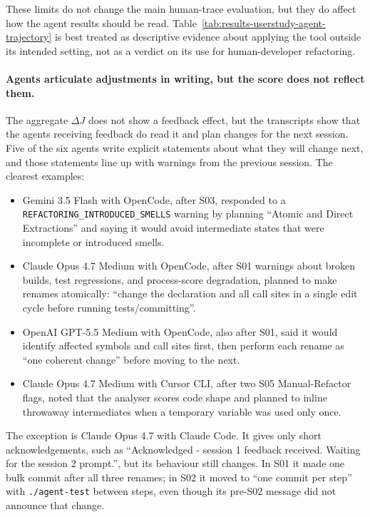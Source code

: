 These limits do not change the main human-trace evaluation, but they do affect how the agent results should be read. Table~\ref{tab:results-userstudy-agent-trajectory} is best treated as descriptive evidence about applying the tool outside its intended setting, not as a verdict on its use for human-developer refactoring.

\paragraph{Agents articulate adjustments in writing, but the score does not reflect them.}
The aggregate $\Delta J$ does not show a feedback effect, but the transcripts show that the agents receiving feedback do read it and plan changes for the next session. Five of the six agents write explicit statements about what they will change next, and those statements line up with warnings from the previous session. The clearest examples:

\begin{itemize}
    \item Gemini 3.5 Flash with OpenCode, after S03, responded to a \texttt{REFACTORING\_INTRODUCED\_SMELLS} warning by planning ``Atomic and Direct Extractions'' and saying it would avoid intermediate states that were incomplete or introduced smells.
    \item Claude Opus 4.7 Medium with OpenCode, after S01 warnings about broken builds, test regressions, and process-score degradation, planned to make renames atomically: ``change the declaration and all call sites in a single edit cycle before running tests/committing''.
    \item OpenAI GPT-5.5 Medium with OpenCode, also after S01, said it would identify affected symbols and call sites first, then perform each rename as ``one coherent change'' before moving to the next.
    \item Claude Opus 4.7 Medium with Cursor CLI, after two S05 Manual-Refactor flags, noted that the analyser scores code shape and planned to inline throwaway intermediates when a temporary variable was used only once.
\end{itemize}

The exception is Claude Opus 4.7 with Claude Code. It gives only short acknowledgements, such as ``Acknowledged - session 1 feedback received. Waiting for the session 2 prompt.'', but its behaviour still changes. In S01 it made one bulk commit after all three renames; in S02 it moved to ``one commit per step'' with \texttt{./agent-test} between steps, even though its pre-S02 message did not announce that change.

